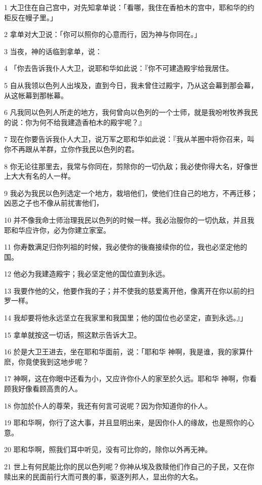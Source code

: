 \par 1 大卫住在自己宫中，对先知拿单说：「看哪，我住在香柏木的宫中，耶和华的约柜反在幔子里。」
\par 2 拿单对大卫说：「你可以照你的心意而行，因为神与你同在。」
\par 3 当夜，神的话临到拿单，说：
\par 4 「你去告诉我仆人大卫，说耶和华如此说：『你不可建造殿宇给我居住。
\par 5 自从我领以色列人出埃及，直到今日，我未曾住过殿宇，乃从这会幕到那会幕，从这帐幕到那帐幕。
\par 6 凡我同以色列人所走的地方，我何曾向以色列的一个士师，就是我吩咐牧养我民的说：你为何不给我建造香柏木的殿宇呢？』
\par 7 现在你要告诉我仆人大卫，说万军之耶和华如此说：『我从羊圈中将你召来，叫你不再跟从羊群，立你作我民以色列的君。
\par 8 你无论往那里去，我常与你同在，剪除你的一切仇敌；我必使你得大名，好像世上大大有名的人一样。
\par 9 我必为我民以色列选定一个地方，栽培他们，使他们住自己的地方，不再迁移；凶恶之子也不像从前扰害他们，
\par 10 并不像我命士师治理我民以色列的时候一样。我必治服你的一切仇敌，并且我耶和华应许你，必为你建立家室。
\par 11 你寿数满足归你列祖的时候，我必使你的後裔接续你的位，我也必坚定他的国。
\par 12 他必为我建造殿宇；我必坚定他的国位直到永远。
\par 13 我要作他的父，他要作我的子；并不使我的慈爱离开他，像离开在你以前的扫罗一样。
\par 14 我却要将他永远坚立在我家里和我国里；他的国位也必坚定，直到永远。』」
\par 15 拿单就按这一切话，照这默示告诉大卫。
\par 16 於是大卫王进去，坐在耶和华面前，说：「耶和华 神啊，我是谁，我的家算什麽，你竟使我到这地步呢？
\par 17 神啊，这在你眼中还看为小，又应许你仆人的家至於久远。耶和华 神啊，你看顾我好像看顾高贵的人。
\par 18 你加於仆人的尊荣，我还有何言可说呢？因为你知道你的仆人。
\par 19 耶和华啊，你行了这大事，并且显明出来，是因你仆人的缘故，也是照你的心意。
\par 20 耶和华啊，照我们耳中听见，没有可比你的，除你以外再无神。
\par 21 世上有何民能比你的民以色列呢？你神从埃及救赎他们作自己的子民，又在你赎出来的民面前行大而可畏的事，驱逐列邦人，显出你的大名。
